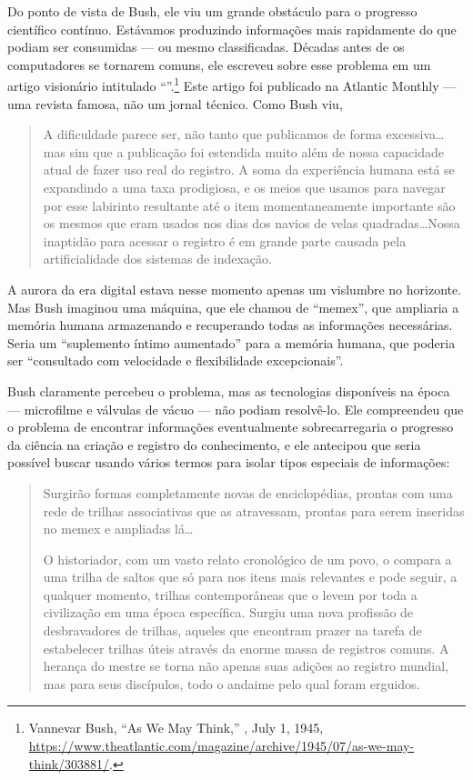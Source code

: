 Do ponto de vista de Bush, ele viu um grande obstáculo para o progresso científico contínuo.
Estávamos produzindo informações mais rapidamente do que podiam ser consumidas --- ou mesmo
classificadas. Décadas antes de os computadores se tornarem comuns, ele escreveu sobre esse
problema em um artigo visionário intitulado ``''.\footnote{Vannevar Bush,
``As We May Think,'' , July 1, 1945,
\url{https://www.theatlantic.com/magazine/archive/1945/07/as-we-may-think/303881/}.} Este artigo
foi publicado na Atlantic Monthly --- uma revista famosa, não um jornal técnico. Como Bush viu,

\begin{quote}
    A dificuldade parece ser, não tanto que publicamos de forma excessiva\ldots mas sim que a
    publicação foi estendida muito além de nossa capacidade atual de fazer uso real do registro.
    A soma da experiência humana está se expandindo a uma taxa prodigiosa, e os meios que usamos
    para navegar por esse labirinto resultante até o item momentaneamente importante são os
    mesmos que eram usados nos dias dos navios de velas quadradas\ldots Nossa inaptidão para
    acessar o registro é em grande parte causada pela artificialidade dos sistemas de indexação.
\end{quote}

A aurora da era digital estava nesse momento apenas um vislumbre no horizonte. Mas Bush imaginou
uma máquina, que ele chamou de ``memex'', que ampliaria a memória humana armazenando e
recuperando todas as informações necessárias. Seria um ``suplemento íntimo aumentado'' para a
memória humana, que poderia ser ``consultado com velocidade e flexibilidade excepcionais''.

Bush claramente percebeu o problema, mas as tecnologias disponíveis na época --- microfilme e
válvulas de vácuo --- não podiam resolvê-lo. Ele compreendeu que o problema de encontrar
informações eventualmente sobrecarregaria o progresso da ciência na criação e registro do
conhecimento, e ele antecipou que seria possível buscar usando vários termos para isolar tipos
especiais de informações:

\begin{quote}
    Surgirão formas completamente novas de enciclopédias, prontas com uma rede de trilhas
    associativas que as atravessam, prontas para serem inseridas no memex e ampliadas lá\ldots
    
    O historiador, com um vasto relato cronológico de um povo, o compara a uma trilha de saltos
    que só para nos itens mais relevantes e pode seguir, a qualquer momento, trilhas
    contemporâneas que o levem por toda a civilização em uma época específica. Surgiu uma nova
    profissão de desbravadores de trilhas, aqueles que encontram prazer na tarefa de estabelecer
    trilhas úteis através da enorme massa de registros comuns. A herança do mestre se torna não
    apenas suas adições ao registro mundial, mas para seus discípulos, todo o andaime pelo qual
    foram erguidos.
\end{quote}

